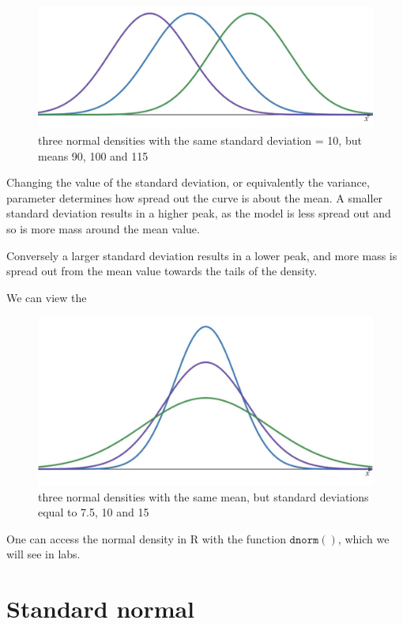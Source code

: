 \documentclass[
]{book}
\theoremstyle{definition}
\theoremstyle{definition}
\theoremstyle{definition}
\theoremstyle{definition}
\theoremstyle{remark}
\begin{document}
\begin{figure}

{\centering \includegraphics[width=0.75\linewidth]{./figures/norm2} 

}

\caption{three normal densities with the same standard deviation = 10, but means 90, 100 and 115}\label{fig:norm2}
\end{figure}

Changing the value of the standard deviation, or equivalently the variance, parameter determines how spread out the curve is about the mean. A smaller standard deviation results in a higher peak, as the model is less spread out and so is more mass around the mean value.

Conversely a larger standard deviation results in a lower peak, and more mass is spread out from the mean value towards the tails of the density.

We can view the

\begin{figure}

{\centering \includegraphics[width=0.75\linewidth]{./figures/norm3} 

}

\caption{three normal densities with the same mean, but standard deviations equal to 7.5, 10 and 15}\label{fig:norm3}
\end{figure}

One can access the normal density in R with the function \(\texttt{dnorm}()\), which we will see in labs.

\hypertarget{standard-normal}{%
\section{Standard normal}\label{standard-normal}}
\end{document}
